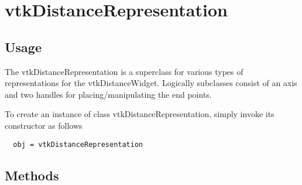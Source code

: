 \section{vtkDistanceRepresentation}

\subsection{Usage}

 The vtkDistanceRepresentation is a superclass for various types of
 representations for the vtkDistanceWidget. Logically subclasses consist of
 an axis and two handles for placing/manipulating the end points.

To create an instance of class vtkDistanceRepresentation, simply
invoke its constructor as follows
\begin{verbatim}
  obj = vtkDistanceRepresentation
\end{verbatim}
\subsection{Methods}


